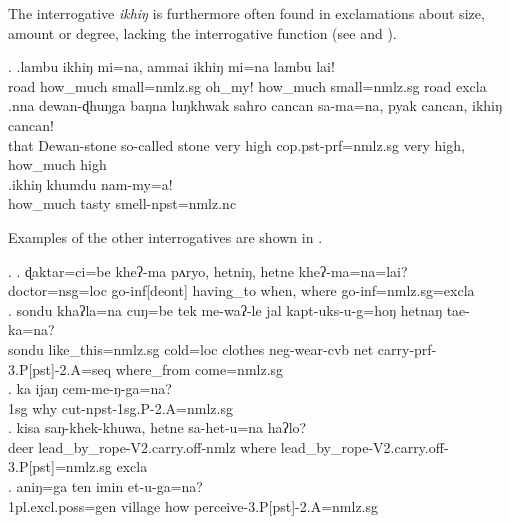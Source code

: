 The interrogative \emph{ikhiŋ} is furthermore often found in exclamations about size, amount or degree, lacking the interrogative function (see \Next and \LLast[b]).

\ex. \ag.lambu ikhiŋ   mi=na, ammai  ikhiŋ   mi=na  lambu lai!\\
road how\_much small{\sc =nmlz.sg} oh\_my! how\_much small{\sc =nmlz.sg} road {\sc excla}\\
 
\bg.nna  dewan-ɖhuŋga baŋna    luŋkhwak sahro cancan sa-ma=na,                pyak cancan, ikhiŋ   cancan!\\
that Dewan-stone so-called stone very high {\sc cop.pst-prf=nmlz.sg} very high, how\_much high\\
\bg.ikhiŋ khumdu nam-my=a!\\
how\_much  tasty smell{\sc [3sg]-npst=nmlz.nc}\\

 Examples of the other interrogatives are shown in \Next.

 \ex. \ag. ɖaktar=ci=be       kheʔ-ma           pʌryo, hetniŋ,  hetne  kheʔ-ma=na=lai?\\
 doctor{\sc =nsg=loc} go{\sc -inf[deont]} having\_to when, where go{\sc -inf=nmlz.sg=excla}\\
  
 \bg. sondu  khaʔla=na          cuŋ=be    tek   me-waʔ-le       jal kapt-uks-u-g=hoŋ                 hetnaŋ    tae-ka=na?\\
 sondu like\_this{\sc =nmlz.sg} cold{\sc =loc} clothes {\sc neg-}wear{\sc -cvb} net carry{\sc -prf-3.P[pst]-2.A=seq} where\_from come{=nmlz.sg}\\
  
 \bg. ka  ijaŋ cem-me-ŋ-ga=na?\\
{\sc 1sg} why cut{\sc -npst-1sg.P-2.A=nmlz.sg}\\
 
\bg. kisa saŋ-khek-khuwa,                         hetne  sa-het-u=na                                     haʔlo?\\
deer lead\_by\_rope{\sc -V2.carry.off-nmlz} where lead\_by\_rope{\sc -V2.carry.off-3.P[pst]=nmlz.sg}  {\sc excla}\\
 
\bg.	aniŋ=ga ten imin et-u-ga=na?\\
			{\sc 1pl.excl.poss=gen} village how perceive{\sc -3.P[pst]-2.A=nmlz.sg}\\


